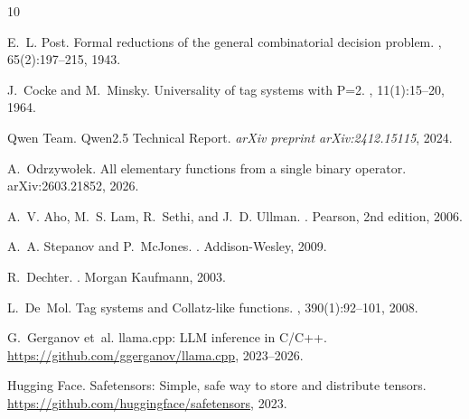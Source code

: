 \documentclass[acmsmall,nonacm]{acmart}
\begin{document}


\begin{thebibliography}{10}

E.~L. Post.
\newblock Formal reductions of the general combinatorial decision problem.
, 65(2):197--215, 1943.

J.~Cocke and M.~Minsky.
\newblock Universality of tag systems with {P}=2.
, 11(1):15--20, 1964.

Qwen Team.
\newblock Qwen2.5 Technical Report.
\newblock \emph{arXiv preprint arXiv:2412.15115}, 2024.

A.~Odrzywołek.
\newblock All elementary functions from a single binary operator.
\newblock arXiv:2603.21852, 2026.

A.~V. Aho, M.~S. Lam, R.~Sethi, and J.~D. Ullman.
.
\newblock Pearson, 2nd edition, 2006.

A.~A. Stepanov and P.~McJones.
.
\newblock Addison-Wesley, 2009.

R.~Dechter.
.
\newblock Morgan Kaufmann, 2003.

L.~De~Mol.
\newblock Tag systems and {C}ollatz-like functions.
, 390(1):92--101, 2008.

G.~Gerganov et~al.
\newblock llama.cpp: {LLM} inference in {C/C++}.
\newblock \url{https://github.com/ggerganov/llama.cpp}, 2023--2026.

Hugging Face.
\newblock Safetensors: Simple, safe way to store and distribute tensors.
\newblock \url{https://github.com/huggingface/safetensors}, 2023.

\end{thebibliography}
\end{document}
